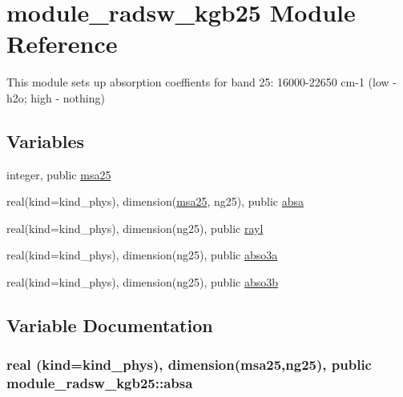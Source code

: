 \hypertarget{namespacemodule__radsw__kgb25}{}\section{module\+\_\+radsw\+\_\+kgb25 Module Reference}
\label{namespacemodule__radsw__kgb25}


This module sets up absorption coeffients for band 25\+: 16000-\/22650 cm-\/1 (low -\/ h2o; high -\/ nothing)  


\subsection*{Variables}
\begin{DoxyCompactItemize}
\item 
integer, public \hyperlink{namespacemodule__radsw__kgb25_afc06df1f3c3a0b2f3189424ed042973e}{msa25}
\item 
real(kind=kind\+\_\+phys), dimension(\hyperlink{namespacemodule__radsw__kgb25_afc06df1f3c3a0b2f3189424ed042973e}{msa25}, ng25), public \hyperlink{namespacemodule__radsw__kgb25_af4daf474954d4689219ada6d0662aceb}{absa}
\item 
real(kind=kind\+\_\+phys), dimension(ng25), public \hyperlink{namespacemodule__radsw__kgb25_a3d32a0d74d03129cacd9c4bb2e58683a}{rayl}
\item 
real(kind=kind\+\_\+phys), dimension(ng25), public \hyperlink{namespacemodule__radsw__kgb25_ab02765dac8ca71a439cdaf1ed2691851}{abso3a}
\item 
real(kind=kind\+\_\+phys), dimension(ng25), public \hyperlink{namespacemodule__radsw__kgb25_a2844cade392c8805b1d418bc1260b3a5}{abso3b}
\end{DoxyCompactItemize}


\subsection{Variable Documentation}
\subsubsection[{\texorpdfstring{absa}{absa}}]{\setlength{\rightskip}{0pt plus 5cm}real (kind=kind\+\_\+phys), dimension({\bf msa25},ng25), public module\+\_\+radsw\+\_\+kgb25\+::absa}\hypertarget{namespacemodule__radsw__kgb25_af4daf474954d4689219ada6d0662aceb}{}\label{namespacemodule__radsw__kgb25_af4daf474954d4689219ada6d0662aceb}


